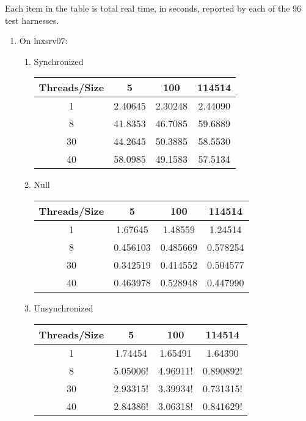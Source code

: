Each item in the table is total real time, in seconds, reported by each of the 96 test harnesses.
\begin{enumerate}
  \item   
  On lnxsrv07:
  \begin{enumerate}
    \item 
    Synchronized
    \begin{center}
      \begin{tabular}{|c|c|c|c|}
      \hline
        Threads/Size & 5 & 100 & 114514 \\
      \hline 1 & 2.40645 & 2.30248 & 2.44090 \\
      \hline 8 & 41.8353 & 46.7085 & 59.6889 \\
      \hline 30 & 44.2645 & 50.3885 & 58.5530 \\
      \hline 40 & 58.0985 & 49.1583 & 57.5134 \\
      \hline
      \end{tabular}
    \end{center}
    \item 
    Null
    \begin{center}
      \begin{tabular}{|c|c|c|c|}
      \hline
        Threads/Size & 5 & 100 & 114514 \\
      \hline 1 & 1.67645 & 1.48559 & 1.24514 \\
      \hline 8 & 0.456103 & 0.485669 & 0.578254 \\
      \hline 30 & 0.342519 & 0.414552 & 0.504577 \\
      \hline 40 & 0.463978 & 0.528948 & 0.447990 \\
      \hline
      \end{tabular}
    \end{center}
    \item 
    Unsynchronized
    \begin{center}
      \begin{tabular}{|c|c|c|c|}
      \hline
        Threads/Size & 5 & 100 & 114514 \\
      \hline 1 & 1.74454 & 1.65491 & 1.64390 \\
      \hline 8 & 5.05006! & 4.96911! & 0.890892! \\
      \hline 30 & 2.93315! & 3.39934! & 0.731315! \\
      \hline 40 & 2.84386! & 3.06318! & 0.841629! \\
      \hline
      \end{tabular}
    \end{center}

\end{enumerate}
\end{enumerate}
